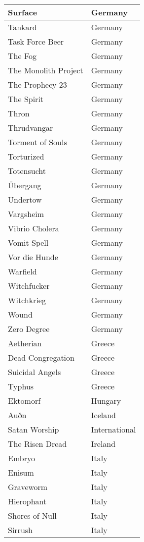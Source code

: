 \documentclass[12pt, a4paper, twoside]{report}
\begin{document}
\begin{center}
\begin{longtable}{|p{5cm}|p{5cm}|}
Surface & Germany \\ \hline
Tankard & Germany \\ \hline
Task Force Beer & Germany \\ \hline
The Fog & Germany \\ \hline
The Monolith Project & Germany \\ \hline
The Prophecy 23 & Germany \\ \hline
The Spirit & Germany \\ \hline
Thron & Germany \\ \hline
Thrudvangar & Germany \\ \hline
Torment of Souls & Germany \\ \hline
Torturized & Germany \\ \hline
Totensucht & Germany \\ \hline
Übergang & Germany \\ \hline
Undertow & Germany \\ \hline
Vargsheim & Germany \\ \hline
Vibrio Cholera & Germany \\ \hline
Vomit Spell & Germany \\ \hline
Vor die Hunde & Germany \\ \hline
Warfield & Germany \\ \hline
Witchfucker & Germany \\ \hline
Witchkrieg & Germany \\ \hline
Wound & Germany \\ \hline
Zero Degree & Germany \\ \hline
Aetherian & Greece \\ \hline
Dead Congregation & Greece \\ \hline
Suicidal Angels & Greece \\ \hline
Typhus & Greece \\ \hline
Ektomorf & Hungary \\ \hline
Auðn & Iceland \\ \hline
Satan Worship & International \\ \hline
The Risen Dread & Ireland \\ \hline
Embryo & Italy \\ \hline
Enisum & Italy \\ \hline
Graveworm & Italy \\ \hline
Hierophant & Italy \\ \hline
Shores of Null & Italy \\ \hline
Sirrush & Italy \\ \hline

\end{longtable}
\end{center}
\end{document}
